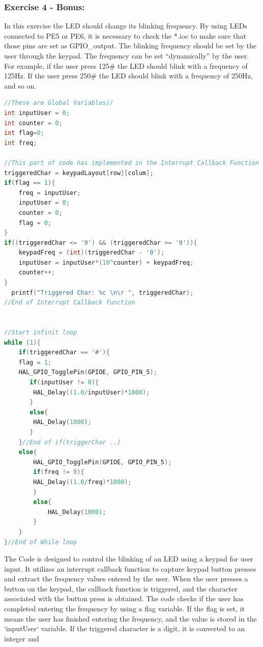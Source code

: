 \documentclass[english]{article}
\begin{document}
\subsubsection{Exercise 4 - Bonus:}
In this exercise the LED should change its blinking frequency. By using LEDs connected to PE5 or PE6, it is necessary to check the *.ioc to make sure that those pins are set as GPIO\_output. The blinking frequency should be set by the user through the keypad. The frequency can be set “dynamically” by the user. For example, if the user press 125\# the LED should blink with a frequency of 125Hz. If the user press 250\# the LED should blink with a frequency of 250Hz, and so on.
\begin{lstlisting}[language=C, caption={C code using listings}, label={lst:flagCode} ]
//These are Global Variables//
int inputUser = 0;
int counter = 0;
int flag=0;
int freq;

//This part of code has implemented in the Interrupt Callback Function
triggeredChar = keypadLayout[row][colum];
if(flag == 1){
    freq = inputUser;
    inputUser = 0;
    counter = 0;
    flag = 0;
}
if((triggeredChar <= '9') && (triggeredChar >= '0')){
    keypadFreq = (int)(triggeredChar - '0');
    inputUser = inputUser*(10^counter) + keypadFreq;
    counter++;
}
  printf("Triggered Char: %c \n\r ", triggeredChar);
//End of Interrupt Callback function


//Start infinit loop
while (1){
    if(triggeredChar == '#'){
	flag = 1;
	HAL_GPIO_TogglePin(GPIOE, GPIO_PIN_5);
	   if(inputUser != 0){
		HAL_Delay((1.0/inputUser)*1000);
	   }
	   else{
		HAL_Delay(1000);
	   }
    }//End of if(triggerChar ..)
    else{
        HAL_GPIO_TogglePin(GPIOE, GPIO_PIN_5);
        if(freq != 0){
        HAL_Delay((1.0/freq)*1000);
        }
        else{
            HAL_Delay(1000);
        }
    }
}//End of While loop
\end{lstlisting}
The Code is designed to control the blinking of an LED using 
a keypad for user input. It utilizes an interrupt callback function to 
capture keypad button presses and extract the frequency values entered by the user.
When the user presses a button on the keypad, the callback function is 
triggered, and the character associated with the button press is obtained.
 The code checks if the user has completed entering the frequency by using a 
 flag variable. If the flag is set, it means the user has finished entering 
 the frequency, and the value is stored in the `inputUser` variable.
If the triggered character is a digit, it is converted to an integer and 
\end{document}
